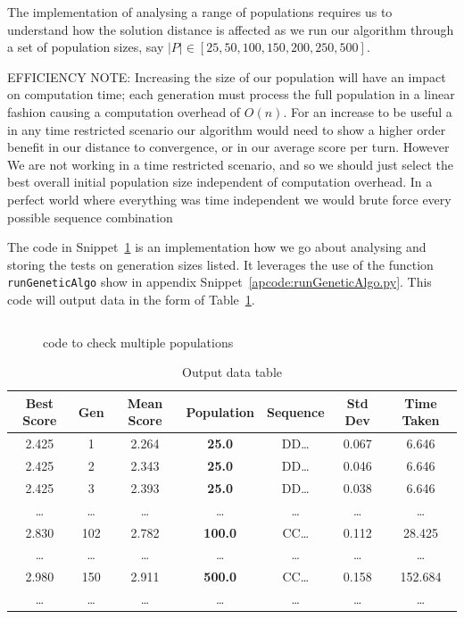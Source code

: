 The implementation of analysing a range of populations requires us to understand how the solution distance is affected as we run our algorithm through a set of population sizes, say \(|P| \in [25,50,100,150,200,250,500]\).

EFFICIENCY NOTE\@: Increasing the size of our population will have an impact on computation time;
each generation must process the full population in a linear fashion causing a computation overhead of \(O(n)\).
For an increase to be useful a in any time restricted scenario our algorithm would need to show a higher order benefit in our distance to convergence, or in our average score per turn.
However We are not working in a time restricted scenario, and so we should just select the best overall initial population size independent of computation overhead.
In a perfect world where everything was time independent we would brute force every possible sequence combination

The code in Snippet~\ref{code:populationChecker} is an implementation how we go about analysing and storing the tests on generation sizes listed.
It leverages the use of the function \texttt{runGeneticAlgo} show in appendix Snippet~\ref{apcode:runGeneticAlgo.py}.
This code will output data in the form of Table~\ref{table:popCheckerDataTable}.

\begin{figure}
    \inputminted[fontsize=\small]{python}{code_snippets/populationChecker.py}
    \caption{code to check multiple populations}\label{code:populationChecker}
\end{figure}

\begin{table}
    \centering
    \begin{tabular}{ccccccc}
        \toprule
        Best Score & Gen & Mean Score & Population & Sequence & Std Dev & Time Taken \\
        \midrule
        2.425 & 1 & 2.264 & \textbf{25.0} & DD\ldots & 0.067 & 6.646\\
        2.425 & 2 & 2.343 & \textbf{25.0} & DD\ldots & 0.046 & 6.646\\
        2.425 & 3 & 2.393 & \textbf{25.0} & DD\ldots & 0.038 & 6.646\\
        \ldots  & \ldots  & \ldots  & \ldots  & \ldots  & \ldots  & \ldots \\
        2.830 & 102 & 2.782 & \textbf{100.0} & CC\ldots & 0.112 & 28.425\\
        \ldots  & \ldots  & \ldots  & \ldots  & \ldots  & \ldots  & \ldots \\
        2.980 & 150 & 2.911 & \textbf{500.0} & CC\ldots & 0.158 & 152.684\\
        \ldots  & \ldots  & \ldots  & \ldots  & \ldots  & \ldots  & \ldots \\
        \bottomrule
    \end{tabular}
    \caption{Output data table}\label{table:popCheckerDataTable}
\end{table}

